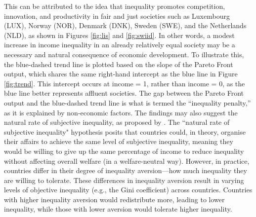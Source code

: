 This can be attributed to the idea that inequality promotes competition, innovation, and productivity in fair and just societies such as Luxembourg (LUX), Norway (NOR), Denmark (DNK), Sweden (SWE), and the Netherlands (NLD), as shown in Figures \ref{fig:lis} and \ref{fig:swiid}. In other words, a modest increase in income inequality in an already relatively equal society may be a necessary and natural consequence of economic development. To illustrate this, the blue-dashed trend line is plotted based on the slope of the Pareto Front output, which shares the same right-hand intercept as the blue line in Figure \ref{fig:trend}. This intercept occurs at income = 1, rather than income = 0, as the blue line better represents affluent societies. The gap between the Pareto Front output and the blue-dashed trend line is what is termed the ``inequality penalty,'' as it is explained by non-economic factors. The findings may also suggest the natural rate of subjective inequality, as proposed by \textcite{lambert2003inequality}. The ``natural rate of subjective inequality" hypothesis posits that countries could, in theory, organise their affairs to achieve the same level of subjective inequality, meaning they would be willing to give up the same percentage of income to reduce inequality without affecting overall welfare (in a welfare-neutral way). However, in practice, countries differ in their degree of inequality aversion—how much inequality they are willing to tolerate. These differences in inequality aversion result in varying levels of objective inequality (e.g., the Gini coefficient) across countries. Countries with higher inequality aversion would redistribute more, leading to lower inequality, while those with lower aversion would tolerate higher inequality.

